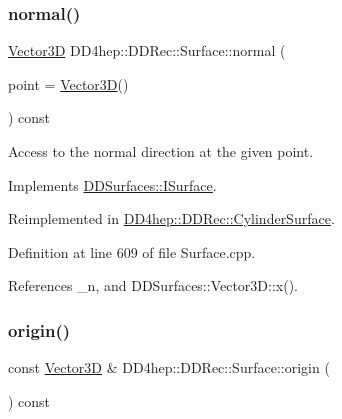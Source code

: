 \subsubsection{\texorpdfstring{normal()}{normal()}}
{\footnotesize\ttfamily \hyperlink{class_d_d_surfaces_1_1_vector3_d}{Vector3D} D\+D4hep\+::\+D\+D\+Rec\+::\+Surface\+::normal (\begin{DoxyParamCaption}\item[{const \hyperlink{class_d_d_surfaces_1_1_vector3_d}{Vector3D} \&}]{point = {\ttfamily \hyperlink{class_d_d_surfaces_1_1_vector3_d}{Vector3D}()} }\end{DoxyParamCaption}) const\hspace{0.3cm}{\ttfamily [virtual]}}



Access to the normal direction at the given point. 



Implements \hyperlink{class_d_d_surfaces_1_1_i_surface_abbead4b1af2864d6d3f61270543310a0}{D\+D\+Surfaces\+::\+I\+Surface}.



Reimplemented in \hyperlink{class_d_d4hep_1_1_d_d_rec_1_1_cylinder_surface_aa995b70c3bfeaa1a21c61b917e4507c5}{D\+D4hep\+::\+D\+D\+Rec\+::\+Cylinder\+Surface}.



Definition at line 609 of file Surface.\+cpp.



References \+\_\+n, and D\+D\+Surfaces\+::\+Vector3\+D\+::x().

\hypertarget{class_d_d4hep_1_1_d_d_rec_1_1_surface_a4910106fc066884c4a53d9fbab52707e}{}\label{class_d_d4hep_1_1_d_d_rec_1_1_surface_a4910106fc066884c4a53d9fbab52707e} 
\subsubsection{\texorpdfstring{origin()}{origin()}}
{\footnotesize\ttfamily const \hyperlink{class_d_d_surfaces_1_1_vector3_d}{Vector3D} \& D\+D4hep\+::\+D\+D\+Rec\+::\+Surface\+::origin (\begin{DoxyParamCaption}{ }\end{DoxyParamCaption}) const\hspace{0.3cm}{\ttfamily [virtual]}}

